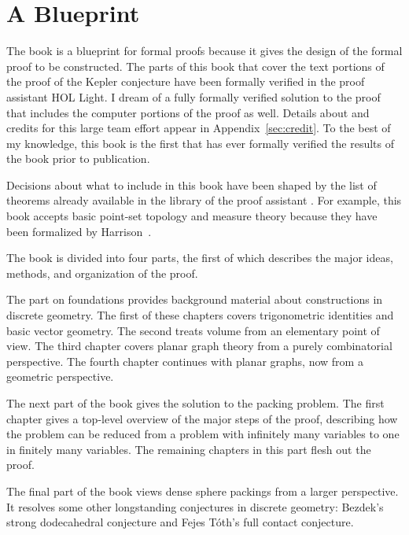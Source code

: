 \section*{A Blueprint}

The book is a blueprint for formal proofs because it gives the design
of the formal proof to be constructed.  
The parts of this book that cover the text portions of the proof of
the Kepler conjecture have been formally verified in the proof
assistant HOL Light.  I dream of a fully formally verified solution to
the proof that includes the computer portions of the proof
as well.  Details about and credits for this large team effort appear in
Appendix~\ref{sec:credit}.  To the best of my knowledge, this book is
the first that has ever formally verified the results of the book
prior to publication.

Decisions about what to
include in this book have been shaped by the list of theorems already
available in the library of the proof assistant .
For example, this book accepts basic point-set topology and measure
theory because they have been formalized by Harrison~\cite{HOLL}.


The book is divided into four parts, the first of which
 describes the major ideas, methods, and
organization of the proof.  


The part on foundations provides background material about
constructions in discrete geometry.  The first of these chapters
covers trigonometric identities and basic vector geometry.  The second
treats volume from an elementary point of view.  The third chapter
covers planar graph theory from a purely combinatorial perspective.
The fourth chapter continues with planar graphs, now from a geometric
perspective.

The next part of the book gives the solution to the packing problem.
The first chapter  gives a top-level overview of the major
steps of the proof,   describing how the problem can be reduced from
a problem with infinitely many variables to one in finitely many
variables.  The remaining chapters in this part flesh out the proof.

The final part of the book views dense sphere packings from a larger perspective.
It  resolves some other longstanding conjectures in
discrete geometry: Bezdek's strong dodecahedral conjecture and Fejes
T\'oth's full contact conjecture.  

